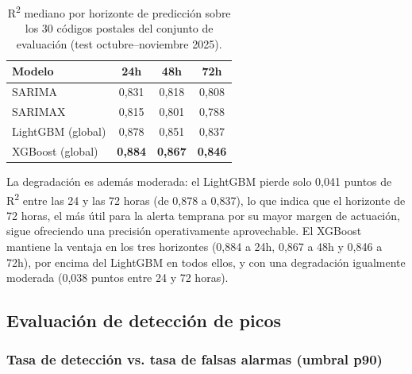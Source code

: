 \documentclass[12pt, a4paper]{article}
\begin{document}
\begin{table}[htbp]
\centering
\caption{R\textsuperscript{2} mediano por horizonte de predicción sobre los 30 códigos postales del conjunto de evaluación (test octubre--noviembre 2025).}
\label{tab:horizonte}
\begin{tabular}{lccc}
\toprule
Modelo & 24h & 48h & 72h \\
\midrule
SARIMA & 0,831 & 0,818 & 0,808 \\
SARIMAX & 0,815 & 0,801 & 0,788 \\
LightGBM (global) & 0,878 & 0,851 & 0,837 \\
XGBoost (global) & \textbf{0,884} & \textbf{0,867} & \textbf{0,846} \\
\bottomrule
\end{tabular}
\end{table}

La degradación es además moderada: el LightGBM pierde solo 0,041 puntos de R\textsuperscript{2} entre las 24 y las 72 horas (de 0,878 a 0,837), lo que indica que el horizonte de 72 horas, el más útil para la alerta temprana por su mayor margen de actuación, sigue ofreciendo una precisión operativamente aprovechable. El XGBoost mantiene la ventaja en los tres horizontes (0,884 a 24h, 0,867 a 48h y 0,846 a 72h), por encima del LightGBM en todos ellos, y con una degradación igualmente moderada (0,038 puntos entre 24 y 72 horas).

\subsection{Evaluación de detección de picos}

\subsubsection{Tasa de detección vs. tasa de falsas alarmas (umbral p90)}
\end{document}
